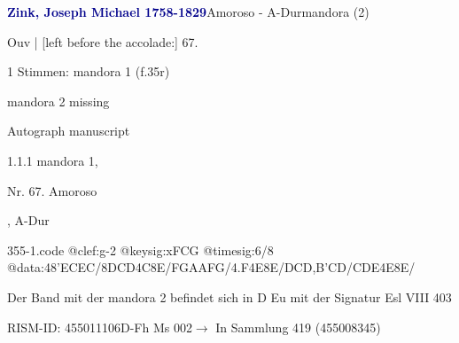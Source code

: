 \documentclass[twocolumn]{book}
\begin{document}
\par \vspace{7pt} \textcolor{darkblue}{\textbf{Zink, Joseph Michael  1758-1829}}\hfillplus{\textbf{[355]}}\newline Amoroso - A-Dur\newline mandora (2)
\par \begin{itshape}[f.35r, at left:] Ouv | [left before the accolade:] 67.\end{itshape} 
\par \textcolor{darkblue}{}  1 Stimmen: mandora 1  (f.35r)\newline \begin{small} mandora 2 missing\end{small} \newline Autograph manuscript
\par 1.1.1  mandora 1, \begin{itshape}Nr. 67. Amoroso\end{itshape}, A-Dur  
\begin{filecontents*}{355-1.code}
@clef:g-2
@keysig:xFCG
@timesig:6/8
@data:48'ECEC/8DCD4C8E/FGAAFG/4.F4E8E/DCD,B'CD/CDE4E8E/
\end{filecontents*}
\newline
%
\par Der Band mit der mandora 2 befindet sich in D Eu mit der Signatur Esl VIII 403
\par RISM-ID: 455011106\newline D-Fh  Ms 002\newline $\rightarrow$ In Sammlung 419 (455008345)
      
\end{document}
